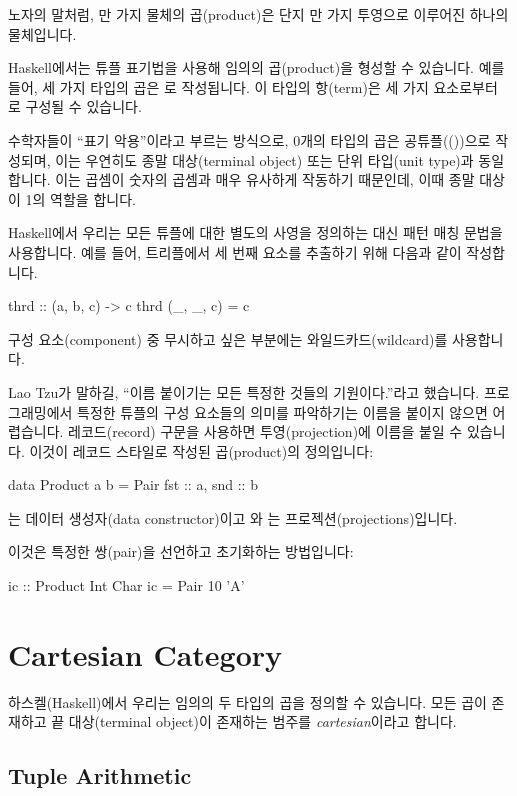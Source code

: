 \documentclass[DaoFP]{subfiles}
\begin{document}
노자의 말처럼, 만 가지 물체의 곱(product)은 단지 만 가지 투영으로 이루어진 하나의 물체입니다.

Haskell에서는 튜플 표기법을 사용해 임의의 곱(product)을 형성할 수 있습니다. 예를 들어, 세 가지 타입의 곱은 로 작성됩니다. 이 타입의 항(term)은 세 가지 요소로부터 로 구성될 수 있습니다.

수학자들이 ``표기 악용''이라고 부르는 방식으로, 0개의 타입의 곱은 공튜플(())으로 작성되며, 이는 우연히도 종말 대상(terminal object) 또는 단위 타입(unit type)과 동일합니다. 이는 곱셈이 숫자의 곱셈과 매우 유사하게 작동하기 때문인데, 이때 종말 대상이 1의 역할을 합니다.

Haskell에서 우리는 모든 튜플에 대한 별도의 사영을 정의하는 대신 패턴 매칭 문법을 사용합니다. 예를 들어, 트리플에서 세 번째 요소를 추출하기 위해 다음과 같이 작성합니다.

\begin{haskell}
thrd :: (a, b, c) -> c
thrd (_, _, c) = c
\end{haskell}
구성 요소(component) 중 무시하고 싶은 부분에는 와일드카드(wildcard)를 사용합니다.

Lao Tzu가 말하길, ``이름 붙이기는 모든 특정한 것들의 기원이다.''라고 했습니다. 프로그래밍에서 특정한 튜플의 구성 요소들의 의미를 파악하기는 이름을 붙이지 않으면 어렵습니다. 레코드(record) 구문을 사용하면 투영(projection)에 이름을 붙일 수 있습니다. 이것이 레코드 스타일로 작성된 곱(product)의 정의입니다:
\begin{haskell}
data Product a b = Pair { fst :: a, snd :: b }
\end{haskell}
는 데이터 생성자(data constructor)이고 와 는 프로젝션(projections)입니다.

이것은 특정한 쌍(pair)을 선언하고 초기화하는 방법입니다:
\begin{haskell}
ic :: Product Int Char
ic = Pair 10 'A'
\end{haskell}

\section{Cartesian Category}

하스켈(Haskell)에서 우리는 임의의 두 타입의 곱을 정의할 수 있습니다. 모든 곱이 존재하고 끝 대상(terminal object)이 존재하는 범주를 \emph{cartesian}이라고 합니다.

\subsection{Tuple Arithmetic}
\end{document}

